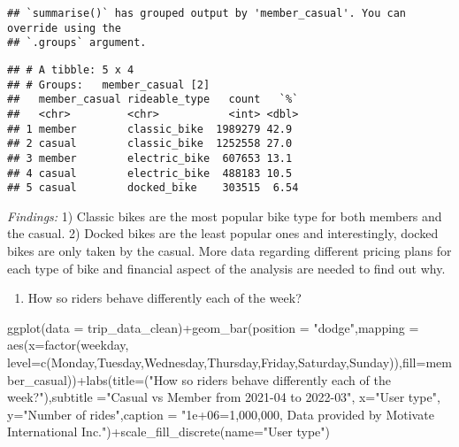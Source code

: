 \documentclass[
]{article}
\newenvironment{Shaded}{\begin{snugshade}}{\end{snugshade}}
\newcommand{\AttributeTok}[1]{\textcolor[rgb]{0.77,0.63,0.00}{#1}}
\newcommand{\FunctionTok}[1]{\textcolor[rgb]{0.00,0.00,0.00}{#1}}
\newcommand{\NormalTok}[1]{#1}
\newcommand{\SpecialCharTok}[1]{\textcolor[rgb]{0.00,0.00,0.00}{#1}}
\newcommand{\StringTok}[1]{\textcolor[rgb]{0.31,0.60,0.02}{#1}}
\providecommand{\tightlist}{%
  \setlength{\itemsep}{0pt}\setlength{\parskip}{0pt}}
\begin{document}
\begin{verbatim}
## `summarise()` has grouped output by 'member_casual'. You can override using the
## `.groups` argument.
\end{verbatim}

\begin{verbatim}
## # A tibble: 5 x 4
## # Groups:   member_casual [2]
##   member_casual rideable_type   count   `%`
##   <chr>         <chr>           <int> <dbl>
## 1 member        classic_bike  1989279 42.9 
## 2 casual        classic_bike  1252558 27.0 
## 3 member        electric_bike  607653 13.1 
## 4 casual        electric_bike  488183 10.5 
## 5 casual        docked_bike    303515  6.54
\end{verbatim}

\emph{Findings:} 1) Classic bikes are the most popular bike type for
both members and the casual. 2) Docked bikes are the least popular ones
and interestingly, docked bikes are only taken by the casual. More data
regarding different pricing plans for each type of bike and financial
aspect of the analysis are needed to find out why.

\begin{enumerate}
\def\labelenumi{\arabic{enumi}.}
\setcounter{enumi}{2}
\tightlist
\item
  How so riders behave differently each of the week?
\end{enumerate}

\begin{Shaded}
\begin{Highlighting}[]
\FunctionTok{ggplot}\NormalTok{(}\AttributeTok{data =}\NormalTok{ trip\_data\_clean)}\SpecialCharTok{+}\FunctionTok{geom\_bar}\NormalTok{(}\AttributeTok{position =} \StringTok{"dodge"}\NormalTok{,}\AttributeTok{mapping =} \FunctionTok{aes}\NormalTok{(}\AttributeTok{x=}\FunctionTok{factor}\NormalTok{(weekday, }\AttributeTok{level=}\FunctionTok{c}\NormalTok{(}\StringTok{\textquotesingle{}Monday\textquotesingle{}}\NormalTok{,}\StringTok{\textquotesingle{}Tuesday\textquotesingle{}}\NormalTok{,}\StringTok{\textquotesingle{}Wednesday\textquotesingle{}}\NormalTok{,}\StringTok{\textquotesingle{}Thursday\textquotesingle{}}\NormalTok{,}\StringTok{\textquotesingle{}Friday\textquotesingle{}}\NormalTok{,}\StringTok{\textquotesingle{}Saturday\textquotesingle{}}\NormalTok{,}\StringTok{\textquotesingle{}Sunday\textquotesingle{}}\NormalTok{)),}\AttributeTok{fill=}\NormalTok{member\_casual))}\SpecialCharTok{+}\FunctionTok{labs}\NormalTok{(}\AttributeTok{title=}\NormalTok{(}\StringTok{"How so riders behave differently each of the week?"}\NormalTok{),}\AttributeTok{subtitle =}\StringTok{"Casual vs Member from 2021{-}04 to 2022{-}03"}\NormalTok{, }\AttributeTok{x=}\StringTok{"User type"}\NormalTok{, }\AttributeTok{y=}\StringTok{"Number of rides"}\NormalTok{,}\AttributeTok{caption =} \StringTok{"1e+06=1,000,000, Data provided by Motivate International Inc."}\NormalTok{)}\SpecialCharTok{+}\FunctionTok{scale\_fill\_discrete}\NormalTok{(}\AttributeTok{name=}\StringTok{"User type"}\NormalTok{)}
\end{Highlighting}
\end{Shaded}
\end{document}
